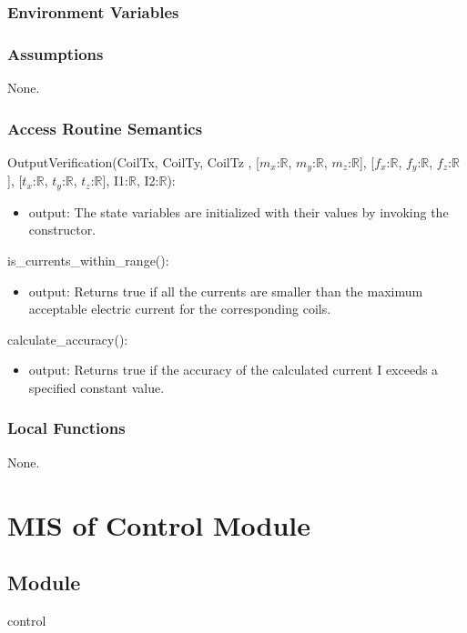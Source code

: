 \documentclass[12pt, titlepage]{article}
\begin{document}
\subsubsection{Environment Variables}

\subsubsection{Assumptions}
None.

\subsubsection{Access Routine Semantics}
\noindent OutputVerification(CoilTx,  CoilTy,  CoilTz , [$m_x$:$\mathbb{R}$, $m_y$:$\mathbb{R}$, $m_z$:$\mathbb{R}$], [$f_x$:$\mathbb{R}$, $f_y$:$\mathbb{R}$, $f_z$:$\mathbb{R}$], [$t_x$:$\mathbb{R}$, $t_y$:$\mathbb{R}$, $t_z$:$\mathbb{R}$], I1:$\mathbb{R}$, I2:$\mathbb{R}$):
\begin{itemize}
\item output: The state variables are initialized with their values by invoking the constructor.
\end{itemize}

\noindent is\_currents\_within\_range():
\begin{itemize}
\item output: Returns true if all the currents are smaller than the maximum acceptable electric current for the corresponding coils.
\end{itemize}

\noindent calculate\_accuracy():
\begin{itemize}
\item output: Returns true if the accuracy of the calculated current I exceeds a specified constant value.
\end{itemize}
\subsubsection{Local Functions}
None.


\section{MIS of Control Module} \label{Mc}

\subsection{Module}
control
\end{document}
